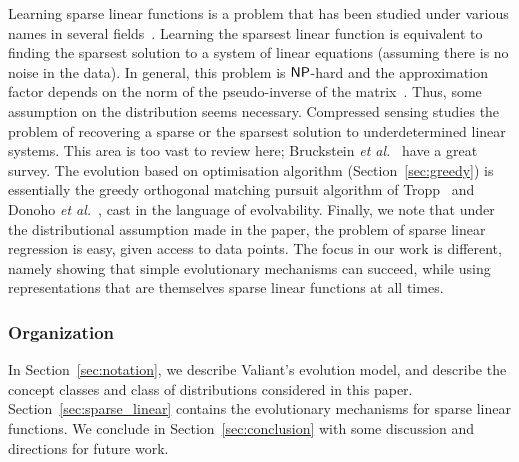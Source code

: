 
Learning sparse linear functions is a problem that has been studied under
various names in several fields~. Learning
the sparsest linear function is equivalent to finding the sparsest solution to a
system of linear equations (assuming there is no noise in the data). In general,
this problem is $\mathsf{NP}$-hard and the approximation factor depends on the norm of
the pseudo-inverse of the matrix~\cite{Natarajan:1995}. Thus, some assumption on
the distribution seems necessary. Compressed sensing studies the problem of
recovering a sparse or the sparsest solution to underdetermined linear systems.
This area is too vast to review here; Bruckstein \emph{et
al.}~\cite{Donoho:2009-sparse} have a great survey. The evolution based on
optimisation algorithm (Section~\ref{sec:greedy}) is essentially the greedy
orthogonal matching pursuit algorithm of Tropp~\cite{Tropp:2004-greed} and
Donoho \emph{et al.}~\cite{Donoho:2006-recovery}, cast in the language of
evolvability. Finally, we note that under the distributional assumption made in
the paper, the problem of sparse linear regression is easy, given access to data
points. The focus in our work is different, namely showing that simple
evolutionary mechanisms can succeed, while using representations that are
themselves sparse linear functions at all times.

\subsubsection*{Organization}

In Section~\ref{sec:notation}, we describe Valiant's evolution model, and describe
the concept classes and class of distributions considered in this paper.
Section~\ref{sec:sparse_linear} contains the evolutionary mechanisms for sparse
linear functions. We conclude in Section~\ref{sec:conclusion} with some
discussion and directions for future work.

